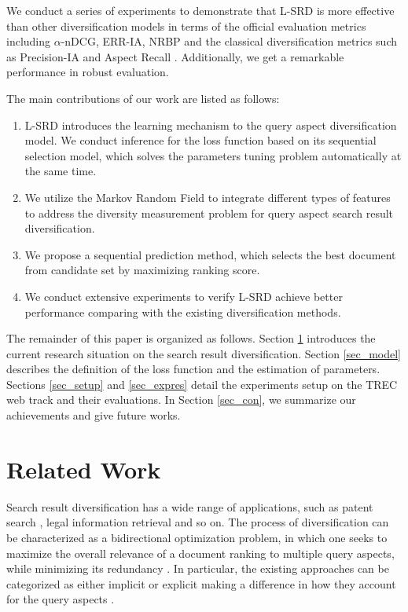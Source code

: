 \documentclass[review]{elsarticle}
\newcommand\revised[1]{{\color{black} #1}}
\begin{document}
We conduct a series of experiments to demonstrate that L-SRD is more effective than other diversification models in terms of the official evaluation metrics including $\alpha$-nDCG, ERR-IA, NRBP  and the classical diversification metrics such as Precision-IA and Aspect Recall \cite{clarke2008novelty,chapelle2009expected,clarke2009effectiveness}. Additionally, we get a remarkable performance in robust evaluation.

The main contributions of our work are listed as follows:
\begin{enumerate}
	\item L-SRD introduces the learning mechanism to the query aspect diversification model. We conduct inference for the loss function based on its sequential selection model, which solves the parameters tuning problem automatically at the same time.
	
	\item We utilize the Markov Random Field to integrate different types of features to address the diversity measurement problem for query aspect search result diversification.
	
	\item We propose a sequential prediction method, which selects the best document from candidate set by maximizing ranking score.
	
	\item We conduct extensive experiments to verify L-SRD achieve better performance comparing with the existing diversification methods.
\end{enumerate}

The remainder of this paper is organized as follows. Section \ref{sec_rel} introduces the current research situation on the search result diversification. Section \ref{sec_model} describes the definition of the loss function and the estimation of parameters. Sections \ref{sec_setup} and \ref{sec_expres} detail the experiments setup on the TREC web track and their evaluations. In Section \ref{sec_con}, we summarize our achievements and give future works.

\section{Related Work}\label{sec_rel}


\revised{
	Search result diversification has a wide range of applications, such as patent search \cite{Kim:2015:IPS:2808194.2809455}, legal information retrieval \cite{a10010022} and so on.
	The process of diversification can be characterized as a bidirectional optimization problem, in which one seeks to maximize the overall relevance of a document ranking to multiple query aspects, while minimizing its redundancy \cite{Santos:2010:EQR:1772690.1772780}. In particular, the existing approaches can be categorized as either implicit or explicit making a difference in how they account for the query aspects \cite{10.1007/978-3-642-12275-0_11}.
	}
\end{document}
